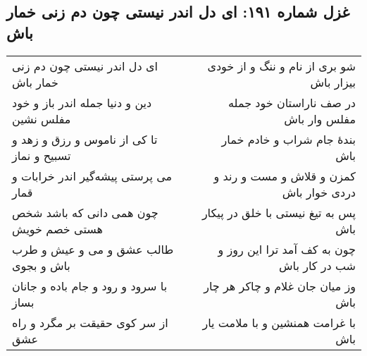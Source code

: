 \begin{center}
\section*{غزل شماره ۱۹۱: ای دل اندر نیستی چون دم زنی خمار باش}
\label{sec:191}
\begin{longtable}{l p{0.5cm} r}
ای دل اندر نیستی چون دم زنی خمار باش
&&
شو بری از نام و ننگ و از خودی بیزار باش
\\
دین و دنیا جمله اندر باز و خود مفلس نشین
&&
در صف ناراستان خود جمله مفلس وار باش
\\
تا کی از ناموس و رزق و زهد و تسبیح و نماز
&&
بندهٔ جام شراب و خادم خمار باش
\\
می پرستی پیشه‌گیر اندر خرابات و قمار
&&
کمزن و قلاش و مست و رند و دردی خوار باش
\\
چون همی دانی که باشد شخص هستی خصم خویش
&&
پس به تیغ نیستی با خلق در پیکار باش
\\
طالب عشق و می و عیش و طرب باش و بجوی
&&
چون به کف آمد ترا این روز و شب در کار باش
\\
با سرود و رود و جام باده و جانان بساز
&&
وز میان جان غلام و چاکر هر چار باش
\\
از سر کوی حقیقت بر مگرد و راه عشق
&&
با غرامت همنشین و با ملامت یار باش
\\
\end{longtable}
\end{center}
